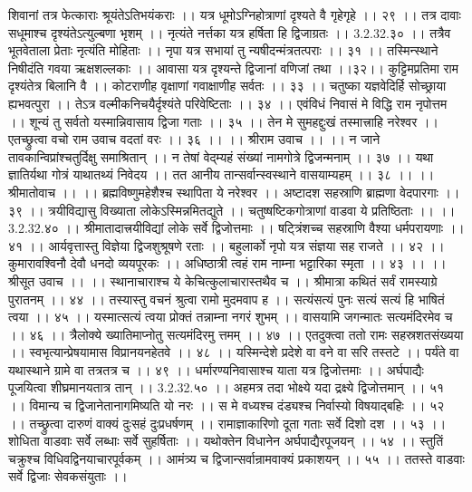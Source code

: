 शिवानां तत्र फेत्काराः श्रूयंतेऽतिभयंकराः ।।
यत्र धूमोऽग्निहोत्राणां दृश्यते वै गृहेगृहे ।। २९ ।।
तत्र दावाः सधूमाश्च दृश्यंतेऽत्युल्बणा भृशम् ।।
नृत्यंते नर्त्तका यत्र हर्षिता हि द्विजाग्रतः ।। 3.2.32.३० ।।
तत्रैव भूतवेताला प्रेताः नृत्यंति मोहिताः ।।
नृपा यत्र सभायां तु न्यषीदन्मंत्रतत्पराः ।। ३१ ।।
तस्मिन्स्थाने निषीदंति गवया ऋक्षशल्लकाः ।।
आवासा यत्र दृश्यन्ते द्विजानां वणिजां तथा ।।३२।।
कुट्टिमप्रतिमा राम दृश्यंतेत्र बिलानि वै ।।
कोटराणीह वृक्षाणां गवाक्षाणीह सर्वतः ।। ३३ ।।
चतुष्का यज्ञवेदिर्हि सोच्छ्राया ह्यभवत्पुरा ।।
तेऽत्र वल्मीकनिचयैर्दृश्यंते परिवेष्टिताः ।। ३४ ।।
एवंविधं निवासं मे विद्धि राम नृपोत्तम ।।
शून्यं तु सर्वतो यस्मान्निवासाय द्विजा गताः ।। ३५ ।।
तेन मे सुमहद्दुःखं तस्मात्त्राहि नरेश्वर ।।
एतच्छ्रुत्वा वचो राम उवाच वदतां वरः ।। ३६ ।।
।। श्रीराम उवाच ।। ।।
न जाने तावकान्विप्रांश्चतुर्दिक्षु समाश्रितान् ।।
न तेषां वेद्म्यहं संख्यां नामगोत्रे द्विजन्मनाम् ।। ३७ ।।
यथा ज्ञातिर्यथा गोत्रं याथातथ्यं निवेदय ।।
तत आनीय तान्सर्वान्स्वस्थाने वासयाम्यहम् ।। ३८ ।।
।। श्रीमातोवाच ।। ।।
ब्रह्मविष्णुमहेशैश्च स्थापिता ये नरेश्वर ।।
अष्टादश सहस्राणि ब्राह्मणा वेदपारगाः ।। ३९ ।।
त्रयीविद्यासु विख्याता लोकेऽस्मिन्नमितद्युते ।।
चतुष्षष्टिकगोत्राणां वाडवा ये प्रतिष्ठिताः ।। ।। 3.2.32.४० ।।
श्रीमातादात्त्रयीविद्यां लोके सर्वे द्विजोत्तमाः ।।
षट्त्रिंशच्च सहस्राणि वैश्या धर्मपरायणाः ।। ४१ ।।
आर्यवृत्तास्तु विज्ञेया द्विजशुश्रूषणे रताः ।।
बहुलार्को नृपो यत्र संज्ञया सह राजते ।। ४२ ।।
कुमारावश्विनौ देवौ धनदो व्ययपूरकः ।।
अधिष्ठात्री त्वहं राम नाम्ना भट्टारिका स्मृता ।। ४३ ।।
।। श्रीसूत उवाच ।। ।।
स्थानाचाराश्च ये केचित्कुलाचारास्तथैव च ।।
श्रीमात्रा कथितं सर्वं रामस्याग्रे पुरातनम् ।। ४४ ।।
तस्यास्तु वचनं श्रुत्वा रामो मुदमवाप ह ।।
सत्यंसत्यं पुनः सत्यं सत्यं हि भाषितं त्वया ।। ४५ ।।
यस्मात्सत्यं त्वया प्रोक्तं तन्नाम्ना नगरं शुभम् ।।
वासयामि जगन्मातः सत्यमंदिरमेव च ।। ४६ ।।
त्रैलोक्ये ख्यातिमाप्नोतु सत्यमंदिरमु त्तमम् ।। ४७ ।।
एतदुक्त्वा ततो रामः सहस्रशतसंख्यया ।।
स्वभृत्यान्प्रेषयामास विप्रानयनहेतवे ।। ४८ ।।
यस्मिन्देशे प्रदेशे वा वने वा सरि तस्तटे ।।
पर्यंते वा यथास्थाने ग्रामे वा तत्रतत्र च ।। ४९ ।।
धर्मारण्यनिवासाश्च याता यत्र द्विजोत्तमाः ।।
अर्घपाद्यैः पूजयित्वा शीघ्रमानयतात्र तान् ।। 3.2.32.५० ।।
अहमत्र तदा भोक्ष्ये यदा द्रक्ष्ये द्विजोत्तमान् ।। ५१ ।।
विमान्य च द्विजानेतानागमिष्यति यो नरः ।।
स मे वध्यश्च दंड्यश्च निर्वास्यो विषयाद्बहिः ।। ५२ ।।
तच्छ्रुत्वा दारुणं वाक्यं दुःसहं दुःप्रधर्षणम् ।।
रामाज्ञाकारिणो दूता गताः सर्वे दिशो दश ।। ५३ ।।
शोधिता वाडवाः सर्वे लब्धाः सर्वे सुहर्षिताः ।।
यथोक्तेन विधानेन अर्घपाद्यैरपूजयन् ।। ५४ ।।
स्तुतिं चक्रुश्च विधिवद्विनयाचारपूर्वकम् ।।
आमंत्र्य च द्विजान्सर्वान्रामवाक्यं प्रकाशयन् ।। ५५ ।।
ततस्ते वाडवाः सर्वे द्विजाः सेवकसंयुताः ।।
